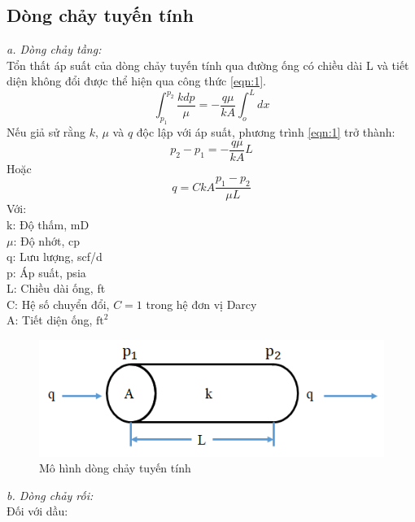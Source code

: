 \documentclass[12pt,a4paper]{report}
\begin{document}
\subsection{Dòng chảy tuyến tính}
\textit{a. Dòng chảy tầng:}\\
Tổn thất áp suất của dòng chảy tuyến tính qua đường ống có chiều dài L và tiết diện không đổi được thể hiện qua công thức \ref{eqn:1}.
	\begin{equation}\label{eqn:1}
		\int_{p_1}^{p_2}\dfrac{kdp}{\mu} = -\dfrac{q\mu}{kA}\int_o^Ldx
	\end{equation}
Nếu giả sử rằng $k$, $\mu$ và $q$ độc lập với áp suất, phương trình \ref{eqn:1} trở thành:
	\begin{equation}
		p_2-p_1 = -\dfrac{q\mu}{kA}L
	\end{equation}
Hoặc
	\begin{equation}
		q=CkA\dfrac{p_1-p_2}{\mu L}
	\end{equation}
Với:\\
\hspace*{1cm}k: Độ thấm, mD\\
\hspace*{1cm}$\mu$: Độ nhớt, cp\\
\hspace*{1cm}q: Lưu lượng, scf/d\\
\hspace*{1cm}p: Áp suất, psia\\
\hspace*{1cm}L: Chiều dài ống, ft\\
\hspace*{1cm}C: Hệ số chuyển đổi, $C=1$ trong hệ đơn vị Darcy\\
\hspace*{1cm}A: Tiết diện ống, $\text{ft}^2$
	\begin{figure}[h]
		\centering
		\includegraphics[scale=1]{Fig/darcy_linear_flow.png}
		\caption[Mô hình dòng chảy tuyến tính]{Mô hình dòng chảy tuyến tính \cite{dale1991production}}
		\label{fig:darcy_linear_flow}
	\end{figure}
\newline
\textit{b. Dòng chảy rối:}\\
Đối với dầu:
\end{document}
